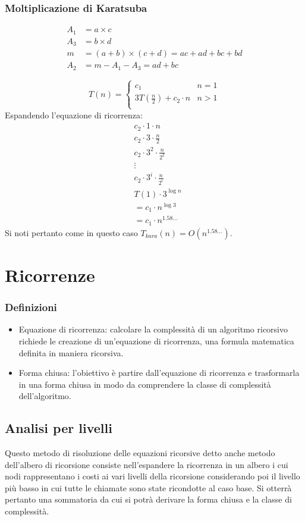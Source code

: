 \subsubsection{Moltiplicazione di Karatsuba}
\begin{align*}
	A_1 &= a\times c\\
	A_3 &= b\times d\\
	m   &= (a+b)\times(c+d) = ac + ad+bc+bd\\
	A_2 &= m - A_1 - A_3 = ad+bc
\end{align*}

$$T(n) = \begin{cases}
	c_1 & n = 1\\
	3T(\frac{n}{2}) + c_2\cdot n &n>1\\
\end{cases}$$
Espandendo l'equazione di ricorrenza: 
\begin{align*}
	&c_2\cdot1\cdot n\\
	&c_2\cdot 3\cdot \frac{n}{2}\\
	&c_2\cdot 3^2\cdot\frac{n}{2^2}\\
	&\vdots\\
	&c_2\cdot 3^i\cdot\frac{n}{2^i}\\
	&T(1)\cdot3^{\log n}\\
	&=c_1\cdot n^{\log 3}\\
	&=c_1\cdot n^{1.58\dots}
\end{align*}
Si noti pertanto come in questo caso $T_{kara}(n) = O(n^{1.58\dots})$.
\section{Ricorrenze}
\subsubsection{Definizioni}
\begin{itemize}
\item Equazione di ricorrenza: calcolare la complessit\`a di un algoritmo ricorsivo richiede le creazione di un'equazione di ricorrenza, una formula 
matematica definita in maniera ricorsiva.
\item Forma chiusa: l'obiettivo \`e partire dall'equazione di ricorrenza e trasformarla in una forma chiusa in modo da comprendere la classe di 
complessit\`a dell'algoritmo.
\end{itemize}
\subsection{Analisi per livelli}
Questo metodo di risoluzione delle equazioni ricorsive detto anche metodo dell'albero di ricorsione consiste nell'espandere la ricorrenza in un albero i cui
nodi rappresentano i costi ai vari livelli della ricorsione considerando poi il livello pi\`u basso in cui tutte le chiamate sono state ricondotte al caso
base. Si otterr\`a pertanto una sommatoria da cui si potr\`a derivare la forma chiusa e la classe di complessit\`a.
